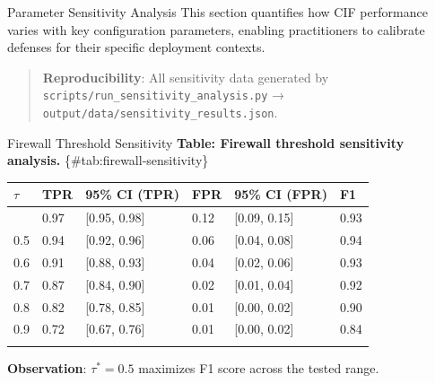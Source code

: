 \documentclass[
  ignorenonframetext,
]{beamer}
\author{\texorpdfstring{}{}}
\date{}
\newcounter{none} %
\begin{document}
\begin{frame}
\newpage
\end{frame}

\begin{frame}[fragile]{Parameter Sensitivity Analysis}
\protect{}\label{sec:sensitivity}
This section quantifies how CIF performance varies with key
configuration parameters, enabling practitioners to calibrate defenses
for their specific deployment contexts.

\begin{quote}
\textbf{Reproducibility}: All sensitivity data generated by
\texttt{scripts/run\_sensitivity\_analysis.py} →
\texttt{output/data/sensitivity\_results.json}.
\end{quote}

\begin{block}{Firewall Threshold Sensitivity}
\protect{}\label{sec:firewall-sensitivity}
\textbf{Table: Firewall threshold sensitivity analysis.}
\{\#tab:firewall-sensitivity\}

{\def\LTcaptype{none} %
\begin{longtable}[]{@{}llllll@{}}
\toprule\noalign{}
\(\tau\) & TPR & 95\% CI (TPR) & FPR & 95\% CI (FPR) & F1 \\
\midrule\noalign{}
\endhead
0.4 & 0.97 & {[}0.95, 0.98{]} & 0.12 & {[}0.09, 0.15{]} & 0.93 \\
0.5 & 0.94 & {[}0.92, 0.96{]} & 0.06 & {[}0.04, 0.08{]} & 0.94 \\
0.6 & 0.91 & {[}0.88, 0.93{]} & 0.04 & {[}0.02, 0.06{]} & 0.93 \\
0.7 & 0.87 & {[}0.84, 0.90{]} & 0.02 & {[}0.01, 0.04{]} & 0.92 \\
0.8 & 0.82 & {[}0.78, 0.85{]} & 0.01 & {[}0.00, 0.02{]} & 0.90 \\
0.9 & 0.72 & {[}0.67, 0.76{]} & 0.01 & {[}0.00, 0.02{]} & 0.84 \\
\bottomrule\noalign{}
\end{longtable}
}

\textbf{Observation}: \(\tau^* = 0.5\) maximizes F1 score across the
tested range.
\end{block}


\end{frame}
\end{document}
